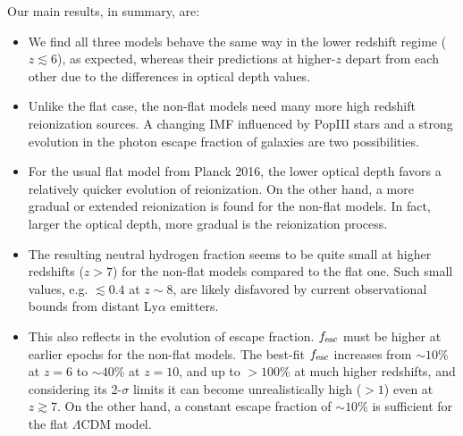 \documentclass[useAMS,usenatbib]{mnras}
\begin{document}
Our main results, in summary, are:
\begin{itemize}
 \item We find all three models behave the same way in the lower redshift 
regime ($z\lesssim6$), as expected,  whereas their predictions at higher-$z$
depart from each other due to the differences in optical depth values.
 \item Unlike the flat case, the non-flat models need many more high redshift
 reionization sources. A changing IMF influenced by PopIII stars and a 
strong evolution in  the photon escape fraction of galaxies are two 
possibilities.
 \item For the usual flat model from Planck 2016, the lower optical depth 
favors a relatively quicker evolution of reionization. On the other hand, 
a more gradual or extended reionization is found for the non-flat models. 
In fact, larger the optical depth, more gradual is the reionization process.
 \item The resulting neutral hydrogen fraction seems to be quite small at 
higher redshifts ($z>7$) for the non-flat models compared to the flat one. 
Such small values, e.g. $\lesssim0.4$ at $z\sim8$, are likely disfavored 
by current observational bounds from distant Ly$\alpha$ emitters.
 \item This also reflects in the evolution of escape fraction. $f_{\rm esc}$
 must be higher at earlier epochs for the non-flat models. 
 The best-fit  $f_{\rm esc}$ increases from $\sim10\%$ at $z=6$ to $\sim40\%$ at $z=10$,
 and up to $>100\%$ at much higher redshifts,
 and considering its 2-$\sigma$ limits it can become unrealistically high
 ($>1$) even at $z\gtrsim7$. On the other hand, a constant escape fraction
 of $\sim10\%$ is sufficient for the flat $\Lambda$CDM model.
\end{itemize}
\end{document}
